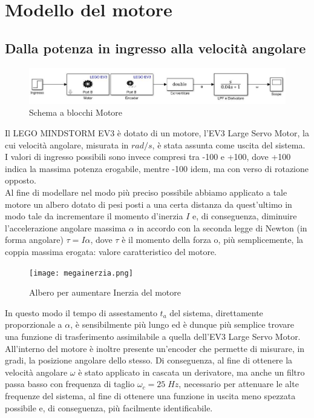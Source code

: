 \chapter{Modello del motore}
\section{Dalla potenza in ingresso alla velocità angolare}

\begin{figure}[ht]
	\centering
	\includegraphics[width=\textwidth]{motoreSimulink.jpg}
	\caption{Schema a blocchi Motore}
	\label{motoreSimulink}
\end{figure}
Il LEGO MINDSTORM EV3 è dotato di un motore, l'EV3 Large Servo Motor, la cui velocità angolare, misurata in $rad/s$, è stata assunta come uscita del sistema.\\
I valori di ingresso possibili sono invece compresi tra -100 e +100, dove +100 indica la massima potenza erogabile, mentre -100 idem, ma con verso di rotazione opposto.\\
Al fine di modellare nel modo più preciso possibile abbiamo applicato a tale motore un albero dotato di pesi posti a una certa distanza da quest'ultimo in modo tale da incrementare il momento d'inerzia $I$ e, di conseguenza, diminuire l'accelerazione angolare massima $\alpha$ in accordo con la seconda legge di Newton (in forma angolare) $\tau = I\alpha$, dove $\tau$ è il momento della forza o, più semplicemente, la coppia massima erogata: valore caratteristico del motore.
\newpage
\begin{figure}[ht]
	\centering
	\texttt{[image: megainerzia.png]}
	\caption{Albero per aumentare Inerzia del motore}
	\label{megainerzia}
\end{figure}
In questo modo il tempo di assestamento $t_a$ del sistema, direttamente proporzionale a $\alpha$, è sensibilmente più lungo ed è dunque più semplice trovare una funzione di trasferimento assimilabile a quella dell'EV3 Large Servo Motor.\\
All'interno del motore è inoltre presente un'encoder che permette di misurare, in gradi, la posizione angolare dello stesso.
Di conseguenza, al fine di ottenere la velocità angolare $\omega$ è stato applicato in cascata un derivatore, ma anche un filtro passa basso con frequenza di taglio $\omega_c=25\;Hz$, necessario per attenuare le alte frequenze del sistema, al fine di ottenere una funzione in uscita meno spezzata possibile e, di conseguenza, più facilmente identificabile.\\
